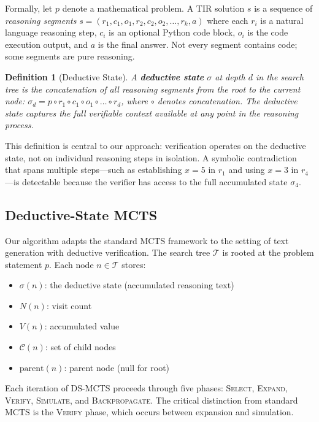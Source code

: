 \documentclass[11pt,a4paper]{article}
\newtheorem{definition}{Definition}
\begin{document}
Formally, let $p$ denote a mathematical problem. A TIR solution $s$ is a
sequence of \emph{reasoning segments} $s = (r_1, c_1, o_1, r_2, c_2, o_2,
\ldots, r_k, a)$ where each $r_i$ is a natural language reasoning step, $c_i$
is an optional Python code block, $o_i$ is the code execution output, and $a$
is the final answer. Not every segment contains code; some segments are pure
reasoning.

\begin{definition}[Deductive State]
A \textbf{deductive state} $\sigma$ at depth $d$ in the search tree is the
concatenation of all reasoning segments from the root to the current node:
$\sigma_d = p \circ r_1 \circ c_1 \circ o_1 \circ \ldots \circ r_d$,
where $\circ$ denotes concatenation. The deductive state captures the full
verifiable context available at any point in the reasoning process.
\end{definition}

This definition is central to our approach: verification operates on the
deductive state, not on individual reasoning steps in isolation. A symbolic
contradiction that spans multiple steps---such as establishing $x = 5$ in
$r_1$ and using $x = 3$ in $r_4$---is detectable because the verifier has
access to the full accumulated state $\sigma_4$.

\subsection{Deductive-State MCTS}

Our algorithm adapts the standard MCTS framework \citep{coulom2006efficient,
kocsis2006bandit} to the setting of text generation with deductive
verification. The search tree $\mathcal{T}$ is rooted at the problem
statement $p$. Each node $n \in \mathcal{T}$ stores:

\begin{itemize}[nosep]
    \item $\sigma(n)$: the deductive state (accumulated reasoning text)
    \item $N(n)$: visit count
    \item $V(n)$: accumulated value
    \item $\mathcal{C}(n)$: set of child nodes
    \item $\text{parent}(n)$: parent node (null for root)
\end{itemize}

Each iteration of DS-MCTS proceeds through five phases: \textsc{Select},
\textsc{Expand}, \textsc{Verify}, \textsc{Simulate}, and
\textsc{Backpropagate}. The critical distinction from standard MCTS is the
\textsc{Verify} phase, which occurs between expansion and simulation.
\end{document}
